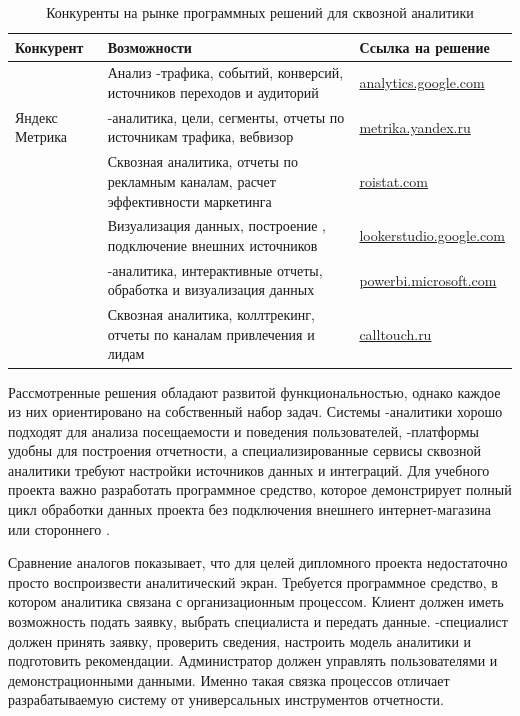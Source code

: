 \begin{table}[H]
    \caption{Конкуренты на рынке программных решений для сквозной аналитики }
    \label{tab:analytics-competitors}
    {\small
    \setlength{\tabcolsep}{4pt}
    \begin{tabularx}{\textwidth}{|P{0.24\textwidth}|L|P{0.24\textwidth}|}
        \hline
        Конкурент & Возможности & Ссылка на решение \\
        \hline
         & Анализ -трафика, событий, конверсий, источников переходов и аудиторий & \url{analytics.google.com} \\
        \hline
        Яндекс Метрика & -аналитика, цели, сегменты, отчеты по источникам трафика, вебвизор & \url{metrika.yandex.ru} \\
        \hline
         & Сквозная аналитика, отчеты по рекламным каналам, расчет эффективности маркетинга & \url{roistat.com} \\
        \hline
         & Визуализация данных, построение , подключение внешних источников & \url{lookerstudio.google.com} \\
        \hline
         & -аналитика, интерактивные отчеты, обработка и визуализация данных & \url{powerbi.microsoft.com} \\
        \hline
         & Сквозная аналитика, коллтрекинг, отчеты по каналам привлечения и лидам & \url{calltouch.ru} \\
        \hline
    \end{tabularx}
    }
\end{table}

Рассмотренные решения обладают развитой функциональностью, однако каждое из них ориентировано на собственный набор задач. Системы -аналитики хорошо подходят для анализа посещаемости и поведения пользователей, -платформы удобны для построения отчетности, а специализированные сервисы сквозной аналитики требуют настройки источников данных и интеграций. Для учебного проекта важно разработать программное средство, которое демонстрирует полный цикл обработки данных  проекта без подключения внешнего интернет-магазина или стороннего .

Сравнение аналогов показывает, что для целей дипломного проекта недостаточно просто воспроизвести аналитический экран. Требуется программное средство, в котором аналитика связана с организационным процессом. Клиент должен иметь возможность подать заявку, выбрать специалиста и передать данные. -специалист должен принять заявку, проверить сведения, настроить модель аналитики и подготовить рекомендации. Администратор должен управлять пользователями и демонстрационными данными. Именно такая связка процессов отличает разрабатываемую систему от универсальных инструментов отчетности.

